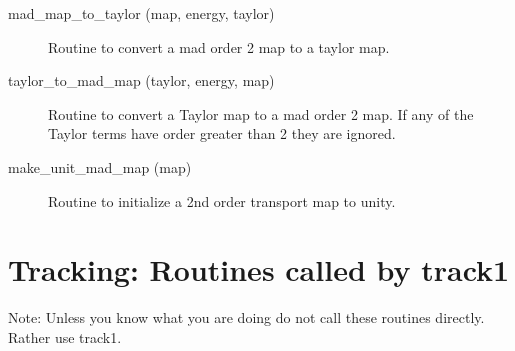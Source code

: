 \begin{description}
\label{r:mad.map.to.taylor}
\item[mad_map_to_taylor (map, energy, taylor)] \Newline 
     Routine to convert a mad order 2 map to a taylor map.

\label{r:taylor.to.mad.map}
\item[taylor_to_mad_map (taylor, energy, map)] \Newline 
     Routine to convert a Taylor map to a mad order 2 map.
     If any of the Taylor terms have order greater than 2 they are ignored.

\label{r:make.unit.mad.map}
\item[make_unit_mad_map (map)] \Newline 
     Routine to initialize a 2nd order transport map to unity.


\end{description}

\section{Tracking: Routines called by track1}
\label{r:track1.call}   

Note: Unless you know what you are doing do not call these routines directly. Rather use
track1.

